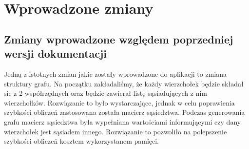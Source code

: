 
\chapter{Wprowadzone zmiany}

	\section{Zmiany wprowadzone względem poprzedniej wersji dokumentacji}
		\label{zmiany:zmiana}
		
		Jedną z istotnych zmian jakie zostały wprowadzone do aplikacji to zmiana struktury grafu. Na początku zakładaliśmy, że każdy wierzchołek będzie składał się z 2 współrzędnych oraz będzie zawierał listę sąsiadujących z nim wierzchołków. Rozwiązanie to było wystarczające, jednak w celu poprawienia szybkości obliczeń zastosowana została macierz sąsiedztwa. Podczas generowania grafu macierz sąsiedztwa była wypełniana wartościami informującymi czy dany wierzchołek jest sąsiadem innego. Rozwiązanie to pozwoliło na polepszenie szybkości obliczeń kosztem wykorzystanem pamięci.
